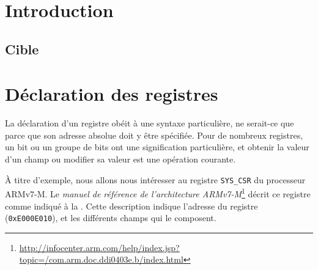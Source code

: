 

\chapter{Introduction}

\thispagestyle{empty}



\section{Cible}




\chapter{Déclaration des registres}

La déclaration d'un registre obéit à une syntaxe particulière, ne serait-ce que parce que son adresse absolue doit y être spécifiée. Pour de nombreux registres, un bit ou un groupe de bits ont une signification particulière, et obtenir la valeur d'un champ ou modifier sa valeur est une opération courante.

À titre d'exemple, nous allons nous intéresser au registre \texttt{SYS\_CSR} du processeur ARMv7-M. Le \emph{manuel de référence de l'architecture ARMv7-M}\footnote{\url{http://infocenter.arm.com/help/index.jsp?topic=/com.arm.doc.ddi0403e.b/index.html}} décrit ce registre comme indiqué à la . Cette description indique l'adresse du registre (\texttt{0xE000E010}), et les différents champs qui le composent.

